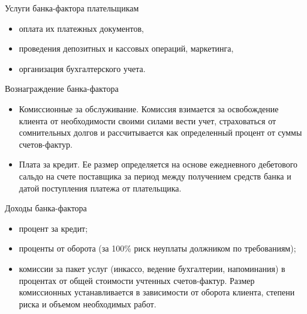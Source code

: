 \documentclass[_Banking_p3.tex]{subfiles}
\begin{document}
\begin{frame}{Услуги банка-фактора плательщикам}
\begin{itemize}[<+->]
\item
оплата их платежных документов,

\item
проведения депозитных и кассовых операций, маркетинга,

\item
организация бухгалтерского учета.

\end{itemize}

\end{frame}
\begin{frame}{Вознаграждение банка-фактора}
\begin{itemize}[<+->]
\item
Комиссионные за обслуживание. Комиссия взимается за освобождение клиента от необходимости своими силами вести учет, страховаться от сомнительных долгов и рассчитывается как определенный процент от суммы счетов-фактур. 

\item
Плата за кредит. Ее размер определяется на основе ежедневного дебетового сальдо на счете поставщика за период между получением средств банка и датой поступления платежа от плательщика. 

\end{itemize}

\end{frame}
\begin{frame}{Доходы банка-фактора }
\begin{itemize}[<+->]
\item
процент за кредит;

\item
проценты от оборота (за 100\% риск неуплаты должником по требованиям);

\item
комиссии за пакет услуг (инкассо, ведение бухгалтерии, напоминания) в процентах от общей стоимости учтенных счетов-фактур. Размер комиссионных устанавливается в зависимости от оборота клиента, степени риска и объемом необходимых работ.

\end{itemize}

\end{frame}
\end{document}
